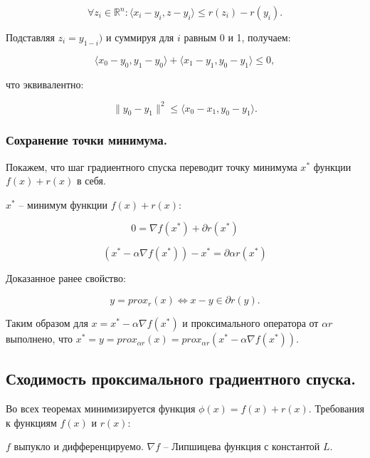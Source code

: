 \begin{equation}
    \forall z_i\in\mathbb{R}^n:
    \langle x_i-y_i,z-y_i\rangle\leq r(z_i)-r(y_i).
\end{equation}

Подставляя $z_i=y_{1-i})$ и суммируя для $i$ равным 0 и 1, получаем:

\begin{equation}
    \langle x_0-y_0,y_1-y_0\rangle+
    \langle x_1-y_1,y_0-y_1\rangle\leq0,
\end{equation}

что эквивалентно:

\begin{equation}
    \|y_0-y_1\|^2\leq\langle x_0-x_1,y_0-y_1\rangle.
\end{equation}

\subsubsection*{Сохранение точки минимума.}

Покажем, что шаг градиентного спуска переводит точку минимума $x^*$ функции $f(x)+r(x)$ в себя.

$x^*$ -- минимум функции $f(x)+r(x)$:

\begin{equation}
    0=\nabla f(x^*)+\partial r(x^*)
\end{equation}

\begin{equation}
    (x^*-\alpha\nabla f(x^*))-x^*=\partial\alpha r(x^*)
\end{equation}

Доказанное ранее свойство:

\begin{equation}
    y=prox_r(x)\iff x-y\in\partial r(y).
\end{equation}

Таким образом для $x=x^*-\alpha\nabla f(x^*)$ и проксимального оператора от $\alpha r$ выполнено, что $x^*=y=prox_{\alpha r}(x)=prox_{\alpha r}(x^*-\alpha\nabla f(x^*))$.

\subsection*{Сходимость проксимального градиентного спуска.}

Во всех теоремах минимизируется функция $\phi(x)=f(x)+r(x)$. Требования к функциям $f(x)$ и $r(x)$:

$f$ выпукло и дифференцируемо. $\nabla f$ -- Липшицева функция с константой $L$.

